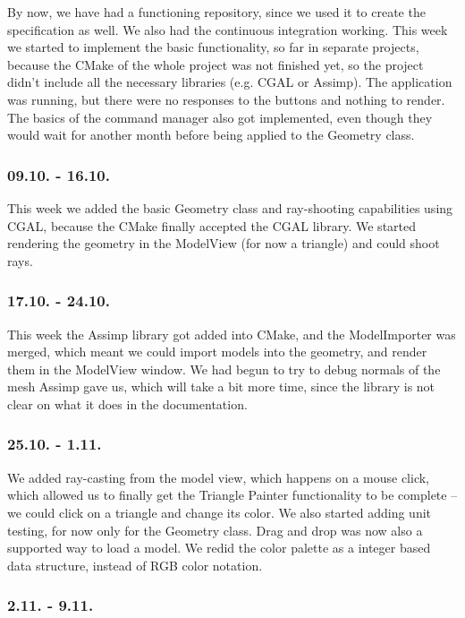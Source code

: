 By now, we have had a functioning repository, since we used it to create the specification as well. We also had the continuous integration working. This week we started to implement the basic functionality, so far in separate projects, because the CMake of the whole project was not finished yet, so the project didn't include all the necessary libraries (e.g. CGAL or Assimp). The application was running, but there were no responses to the buttons and nothing to render. The basics of the command manager also got implemented, even though they would wait for another month before being applied to the Geometry class.

\subsubsection{09.10. - 16.10.}

This week we added the basic Geometry class and ray-shooting capabilities using CGAL, because the CMake finally accepted the CGAL library. We started rendering the geometry in the ModelView (for now a triangle) and could shoot rays.

\subsubsection{17.10. - 24.10.}

This week the Assimp library got added into CMake, and the ModelImporter was merged, which meant we could import models into the geometry, and render them in the ModelView window. We had begun to try to debug normals of the mesh Assimp gave us, which will take a bit more time, since the library is not clear on what it does in the documentation.

\subsubsection{25.10. - 1.11.}

We added ray-casting from the model view, which happens on a mouse click, which allowed us to finally get the Triangle Painter functionality to be complete -- we could click on a triangle and change its color. We also started adding unit testing, for now only for the Geometry class. Drag and drop was now also a supported way to load a model. We redid the color palette as a integer based data structure, instead of RGB color notation.

\subsubsection{2.11. - 9.11.}

